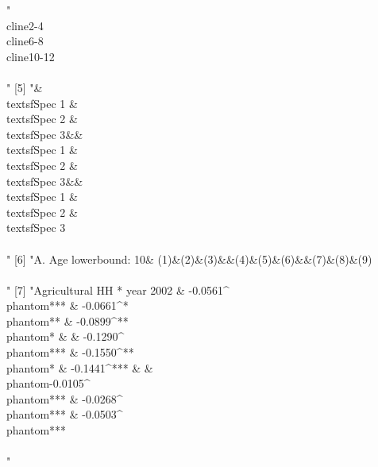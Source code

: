 \begin{Schunk}
\begin{Soutput}
 [4] "\\cline{2-4} \\cline{6-8} \\cline{10-12} \\\\[-1ex]"                                                                                                                                                                                                                                                                                                                                                
 [5] "&\\textsf{Spec 1} & \\textsf{Spec 2} & \\textsf{Spec 3}&&\\textsf{Spec 1} & \\textsf{Spec 2} & \\textsf{Spec 3}&&\\textsf{Spec 1} & \\textsf{Spec 2} & \\textsf{Spec 3}\\\\"                                                                                                                                                                                                                        
 [6] "A. Age lowerbound: 10& (1)&(2)&(3)&&(4)&(5)&(6)&&(7)&(8)&(9) \\\\"                                                                                                                                                                                                                                                                                                                                  
 [7] "Agricultural HH * year 2002 & -0.0561^{\\phantom{***}} & -0.0661^{*\\phantom{**}} & -0.0899^{**\\phantom{*}} &  & -0.1290^{\\phantom{***}} & -0.1550^{**\\phantom{*}} & -0.1441^{***} &  & \\phantom{-}0.0105^{\\phantom{***}} & -0.0268^{\\phantom{***}} & -0.0503^{\\phantom{***}}\\\\[-1ex]"                                                                                                     

\end{Soutput}
\end{Schunk}
